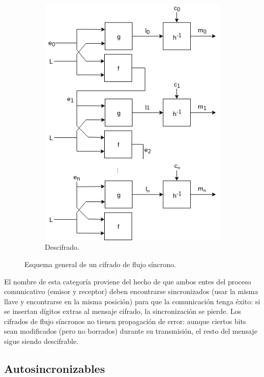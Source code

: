 \begin{figure}[H]
\begin{subfigure}{0.45\textwidth}
\begin{center}
      \includegraphics[width=0.9\linewidth]
        {contenidos/antecedentes/cifrados_de_flujo/diagramas/sincrono_descifrado.png}
      \caption{Descifrado.}
    \end{center}
  \end{subfigure}
  \caption{Esquema general de un cifrado de flujo síncrono.}
  \label{flujo_sincrono}
\end{figure}

El nombre de esta categoría proviene del hecho de que ambos entes del proceso
comunicativo (emisor y receptor) deben encontrarse sincronizados (usar la misma
llave y encontrarse en la misma posición) para que la comunicación tenga éxito:
si se insertan dígitos extras al mensaje cifrado, la sincronización se pierde.
Los cifrados de flujo síncronos no tienen propagación de error: aunque ciertos
bits sean modificados (pero no borrados) durante su transmisión, el resto del
mensaje sigue siendo descifrable.

\subsection{Autosincronizables}

